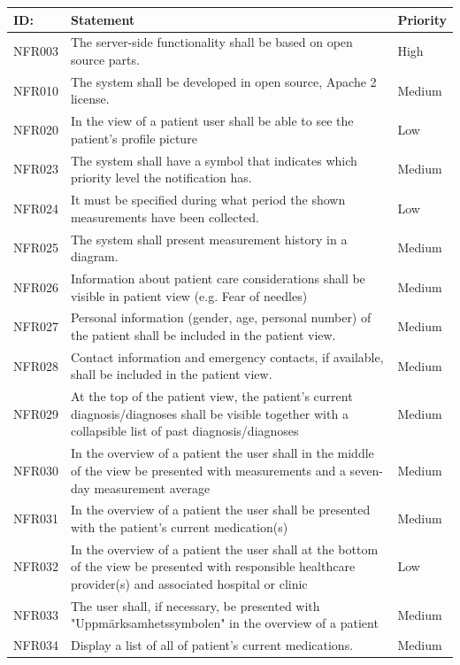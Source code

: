 \documentclass{scrreprt}
\begin{document}
\begin{center}
\begin{tabularx}{\linewidth}{| l | X | l |}
\hline
\textbf{ID:} & \textbf{Statement} & \textbf{Priority} \\
\hline
NFR003 & 
The server-side functionality shall be based on open source parts. &
High \\ 
\hline
NFR010 & 
The system shall be developed in open source, Apache 2 license. &
Medium \\ 
\hline
NFR020 & 
In the view of a patient user shall be able to see the patient's profile picture &
Low \\ 
\hline
NFR023 & 
The system shall have a symbol that indicates which priority level the notification has. &
Medium \\ 
\hline
NFR024 & 
It must be specified during what period the shown measurements have been collected. &
Low \\ 
\hline
NFR025 & 
The system shall present measurement history in a diagram. &
Medium \\ 
\hline
NFR026 & 
Information about patient care considerations shall be visible in patient view (e.g. Fear of needles)  &
Medium \\ 
\hline
NFR027 & 
Personal information (gender, age, personal number) of the patient shall be included in the patient view. &
Medium \\ 
\hline
NFR028 & 
Contact information and emergency contacts, if available, shall be included in the patient view. &
Medium \\ 
\hline
NFR029 & 
At the top of the patient view, the patient's current diagnosis/diagnoses shall be visible together with a collapsible list of past diagnosis/diagnoses &
Medium \\ 
\hline
NFR030 & 
In the overview of a patient the user shall in the middle of the view be presented with measurements and a seven-day measurement average &
Medium \\ 
\hline
NFR031 & 
In the overview of a patient the user shall be presented with the patient’s current medication(s) &
Medium \\ 
\hline
NFR032 & 
In the overview of a patient the user shall at the bottom of the view be presented with responsible healthcare provider(s) and associated hospital or clinic &
Low \\ 
\hline
NFR033 & 
The user shall, if necessary, be presented with "Uppmärksamhetssymbolen" in the overview of a patient &
Medium \\ 
\hline
NFR034 & 
Display a list of all of patient's current medications.  &
Medium \\ 
\hline
\end{tabularx}
\end{center}
\end{document}
